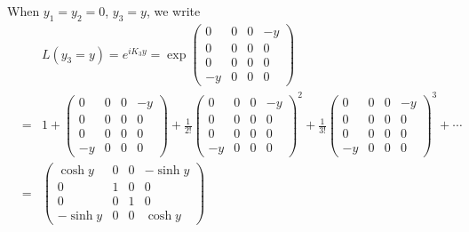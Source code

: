 \documentclass[11pt]{article}
\begin{document}
\section{ }
When $y_1=y_2=0$, $y_3=y$, we write
\begin{eqnarray}
    &&L(y_3 = y)
    = e^{ i K_3 y }= \exp
    {\begin{pmatrix}
        0 & 0 & 0 & -y \\
        0 & 0 & 0 & 0 \\
        0 & 0 & 0 & 0 \\
        -y & 0 & 0 & 0 
    \end{pmatrix}}\\
    &=&
    1+
    \begin{pmatrix}
        0 & 0 & 0 & -y \\
        0 & 0 & 0 & 0 \\
        0 & 0 & 0 & 0 \\
        -y & 0 & 0 & 0 
    \end{pmatrix}
    +\frac{1}{2!}\begin{pmatrix}
        0 & 0 & 0 & -y \\
        0 & 0 & 0 & 0 \\
        0 & 0 & 0 & 0 \\
        -y & 0 & 0 & 0 
    \end{pmatrix}^2
    +\frac{1}{3!}\begin{pmatrix}
        0 & 0 & 0 & -y \\
        0 & 0 & 0 & 0 \\
        0 & 0 & 0 & 0 \\
        -y & 0 & 0 & 0 
    \end{pmatrix}^3
    +\cdots \\
    &=&
    \begin{pmatrix}
        \cosh y & 0 & 0 & -\sinh y \\
        0 & 1 & 0 & 0 \\
        0 & 0 & 1 & 0 \\
        -\sinh y & 0 & 0 & \cosh y
    \end{pmatrix}
  \end{eqnarray}
\end{document}
